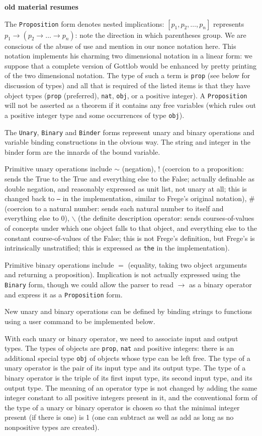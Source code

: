 \documentclass{article}
\begin{document}
{{{\bf old material resumes }

The {\tt Proposition} form denotes nested implications:  $[p_1,p_2,\ldots,p_n]$ represents $p_1 \rightarrow (p_2 \rightarrow \ldots \rightarrow p_n)$:  note the direction in which parentheses group.  We are conscious of the abuse of use and mention in our nonce notation here.  This notation implements his charming two dimensional notation in a linear form:  we suppose that a complete version of Gottlob would be enhanced by pretty printing of the two dimensional notation.  The type of such a term is {\tt prop} (see below for discussion of types) and all that is required of the listed items is that they have object types ({\tt prop} (preferred), {\tt nat}, {\tt obj}, or a positive integer).  A {\tt Proposition} will not be asserted as a theorem if it contains any free variables (which rules out a positive integer type and some occurrences of type {\tt obj}).

The {\tt Unary}, {\tt Binary} and {\tt Binder} forms represent unary and binary operations and variable binding constructions in the obvious way.  The string and integer in the binder form are the innards of the bound variable.

Primitive unary operations include $\sim$ (negation), $!$ (coercion to a proposition:  sends the True to the True and everything else to the False; actually definable as double negation, and reasonably expressed as unit list, not unary at all; this is changed back to {\tt --} in the implementation, similar to Frege's original notation), $\#$ (coercion to a natural number:  sends each natural number to itself and everything else to 0), $\backslash$ (the definite description operator:  sends courses-of-values of concepts under which one object falls to that object, and everything else to the constant course-of-values of the False; this is not Frege's definition, but Frege's is intrinsically unstratified;  this is expressed as {\tt the} in the implementation).

Primitive binary operations include $=$ (equality, taking two object arguments and returning a proposition).  Implication is not actually expressed using the {\tt Binary} form, though we could allow the parser to read $\rightarrow$ as a binary operator and express it as a {\tt Proposition} form.

New unary and binary operations can be defined by binding strings to functions using a user command to be implemented below.

With each unary or binary operator, we need to associate input and output types.  The types of objects are {\tt prop}, {\tt nat} and positive integers:  there is an additional special type {\tt obj} of objects whose type can be left free.
The type of a unary operator is the pair of its input type and its output type.  The type of a binary operator is the triple of its first input type, its second
input type, and its output type.  The meaning of an operator type is not changed by adding the same integer constant to all positive integers present in it, and the conventional form of the type of a unary or binary operator is chosen so that the minimal integer present (if there is one) is 1 (one can subtract as well as add as long as no nonpositive types are created).

}}
\end{document}
